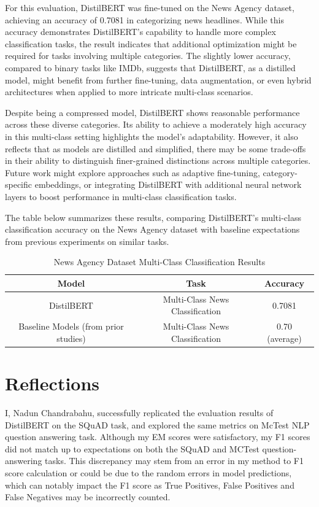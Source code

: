 \documentclass[
  11pt,
]{article}
\begin{document}
For this evaluation, DistilBERT was fine-tuned on the News Agency dataset, achieving an accuracy of 0.7081 in categorizing news headlines. While this accuracy demonstrates DistilBERT’s capability to handle more complex classification tasks, the result indicates that additional optimization might be required for tasks involving multiple categories. The slightly lower accuracy, compared to binary tasks like IMDb, suggests that DistilBERT, as a distilled model, might benefit from further fine-tuning, data augmentation, or even hybrid architectures when applied to more intricate multi-class scenarios.

Despite being a compressed model, DistilBERT shows reasonable performance across these diverse categories. Its ability to achieve a moderately high accuracy in this multi-class setting highlights the model’s adaptability. However, it also reflects that as models are distilled and simplified, there may be some trade-offs in their ability to distinguish finer-grained distinctions across multiple categories. Future work might explore approaches such as adaptive fine-tuning, category-specific embeddings, or integrating DistilBERT with additional neural network layers to boost performance in multi-class classification tasks.

The table below summarizes these results, comparing DistilBERT’s multi-class classification accuracy on the News Agency dataset with baseline expectations from previous experiments on similar tasks.

\begin{table}[h]
\centering
\caption{News Agency Dataset Multi-Class Classification Results}
\begin{tabular}{|c|c|c|}
\hline
\textbf{Model} & \textbf{Task} & \textbf{Accuracy} \\
\hline
DistilBERT & Multi-Class News Classification & 0.7081 \\
\hline
Baseline Models (from prior studies) & Multi-Class News Classification & 0.70 (average) \\
\hline
\end{tabular}
\label{tab:news_agency_results}
\end{table}


\section{Reflections}\label{reflections}

I, Nadun Chandrabahu, successfully replicated the evaluation results of
DistilBERT on the SQuAD task, and explored the same metrics on McTest
NLP question answering task. Although my EM scores were satisfactory, my
F1 scores did not match up to expectations on both the SQuAD and MCTest
question-answering tasks. This discrepancy may stem from an error in my
method to F1 score calculation or could be due to the random errors in
model predictions, which can notably impact the F1 score as True
Positives, False Positives and False Negatives may be incorrectly
counted.
\end{document}
